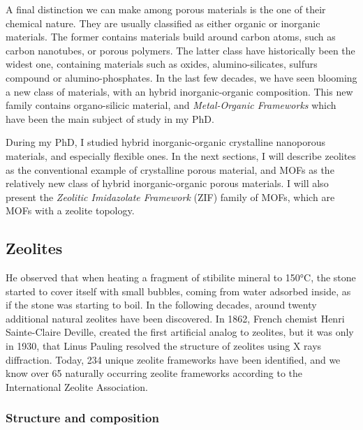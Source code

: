 \documentclass[thesis]{subfiles}
\begin{document}
A final distinction we can make among porous materials is the one of their
chemical nature. They are usually classified as either organic or inorganic
materials. The former contains materials build around carbon atoms, such as
carbon nanotubes, or porous polymers. The latter class have historically been
the widest one, containing materials such as oxides, alumino-silicates, sulfurs
compound or alumino-phosphates. In the last few decades, we have seen blooming a
new class of materials, with an hybrid inorganic-organic composition. This new
family contains organo-silicic material, and \emph{Metal-Organic Frameworks}
which have been the main subject of study in my PhD.

During my PhD, I studied hybrid inorganic-organic crystalline nanoporous
materials, and especially flexible ones. In the next sections, I will describe
zeolites as the conventional example of crystalline porous material, and MOFs as
the relatively new class of hybrid inorganic-organic porous materials. I will
also present the \emph{Zeolitic Imidazolate Framework} (ZIF) family of MOFs,
which are MOFs with a zeolite topology.

\subsection{Zeolites}

He observed that when heating a fragment of stibilite mineral to 150°C, the
stone started to cover itself with small bubbles, coming from water adsorbed
inside, as if the stone was starting to boil. In the following decades, around
twenty additional natural zeolites have been discovered. In 1862, French chemist
Henri Sainte-Claire Deville, created the first artificial analog to zeolites,
but it was only in 1930, that Linus Pauling resolved the structure of zeolites
using X rays diffraction. Today, 234 unique zeolite frameworks have been
identified, and we know over 65 naturally occurring zeolite frameworks according
to the International Zeolite Association\cite{iza-website}.

\subsubsection{Structure and composition}
\end{document}
